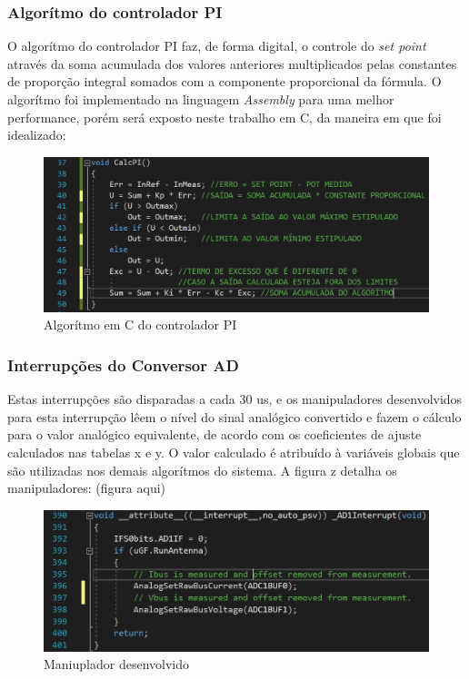 \subsubsection{Algorítmo do controlador PI}
O algorítmo do controlador PI faz, de forma digital, o controle do \textit{set point} através da soma acumulada dos valores anteriores multiplicados pelas constantes de proporção integral somados com a componente proporcional da fórmula. O algorítmo foi implementado na linguagem \textit{Assembly} para uma melhor performance, porém será exposto neste trabalho em C, da maneira em que foi idealizado:

\begin{figure}[H]
    \centering
    \includegraphics[width=1\textwidth]{./dados/figuras/func_pi}
    \caption{Algorítmo em C do controlador PI}
    \label{fig:figura-magnetron-usado}
\end{figure}

\subsubsection{Interrupções do Conversor AD}
Estas interrupções são disparadas a cada 30 us, e os manipuladores desenvolvidos para esta interrupção lêem o nível do sinal analógico convertido e fazem o cálculo para o valor analógico equivalente, de acordo com os coeficientes de ajuste calculados nas tabelas x e y. O valor calculado é atribuído à variáveis globais que são utilizadas nos demais algorítmos do sistema. A figura z detalha os manipuladores:
(figura aqui)

\begin{figure}[H]
    \centering
    \includegraphics[width=1\textwidth]{./dados/figuras/irq_ad}
    \caption{Maniuplador desenvolvido}
    \label{fig:figura-magnetron-usado}
\end{figure}


